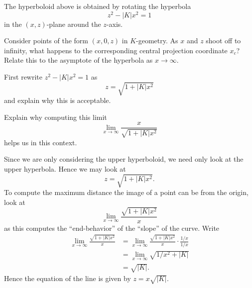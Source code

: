 \documentclass[newpage,hints,handout,12pt,noauthor,nooutcomes]{ximera}
\begin{document}
The hyperboloid above is obtained by rotating the hyperbola
\[
z^{2}-\left\vert K\right\vert x^{2}= 1
\]
in the $(x,z)$-plane around the $z$-axis.
\begin{center}
\end{center}


\begin{problem}
  Consider points of the form $(x,0,z)$ in $K$-geometry.  As $x$ and $z$ shoot
  off to infinity, what happens to the corresponding central projection
  coordinate $x_c$?  Relate this to the asymptote of the hyperbola as
  $x \to \infty$.
  \begin{hint}
    First rewrite $z^{2}-|K|x^{2} =1$ as
    \[
    z = \sqrt{1+|K|x^2}
    \]
    and explain why this is acceptable.
  \end{hint}
  \begin{hint}
    Explain why computing this limit
    \[
    \lim_{x\to \infty} \frac{x}{\sqrt{1+|K|x^2}}
    \]
    helps us in this context.
  \end{hint}
  \begin{freeResponse}
    Since we are only considering the upper hyperboloid, we need only
    look at the upper hyperbola. Hence we may look at
     \[
    z = \sqrt{1+|K|x^2}.
    \]
    To compute the maximum distance the image of a point can be from
    the origin, look at 
    \[
    \lim_{x\to \infty} \frac{\sqrt{1+|K|x^2}}{x}
    \]
    as this computes the ``end-behavior'' of the ``slope'' of the
    curve. Write
    \begin{align*}
      \lim_{x\to \infty} \frac{\sqrt{1+|K|x^2}}{x} &= \lim_{x\to \infty} \frac{\sqrt{1+|K|x^2}}{x}\cdot \frac{1/x}{1/x}\\
      &= \lim_{x\to \infty} \sqrt{1/x^2+|K|}\\
      &= \sqrt{|K|}.
    \end{align*}
    Hence the equation of the line is given by $z = x\sqrt{|K|}$.
  \end{freeResponse}
\end{problem}
\end{document}
